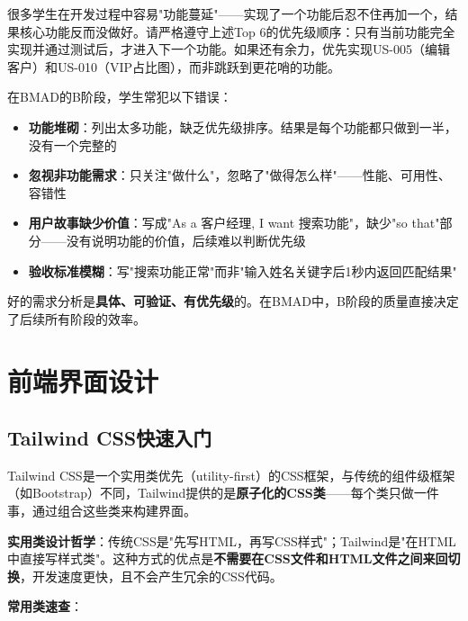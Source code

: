 \begin{notebox}[关于功能范围控制]
很多学生在开发过程中容易"功能蔓延"——实现了一个功能后忍不住再加一个，结果核心功能反而没做好。请严格遵守上述Top 6的优先级顺序：只有当前功能完全实现并通过测试后，才进入下一个功能。如果还有余力，优先实现US-005（编辑客户）和US-010（VIP占比图），而非跳跃到更花哨的功能。\end{notebox}

\begin{theorybox}[需求分析中的常见陷阱]
在BMAD的B阶段，学生常犯以下错误：
\begin{itemize}[leftmargin=2em]
  \item \textbf{功能堆砌}：列出太多功能，缺乏优先级排序。结果是每个功能都只做到一半，没有一个完整的
  \item \textbf{忽视非功能需求}：只关注"做什么"，忽略了"做得怎么样"——性能、可用性、容错性
  \item \textbf{用户故事缺少价值}：写成"As a 客户经理, I want 搜索功能"，缺少"so that"部分——没有说明功能的价值，后续难以判断优先级
  \item \textbf{验收标准模糊}：写"搜索功能正常"而非"输入姓名关键字后1秒内返回匹配结果"
\end{itemize}
好的需求分析是\textbf{具体、可验证、有优先级}的。在BMAD中，B阶段的质量直接决定了后续所有阶段的效率。\end{theorybox}

\section{前端界面设计}

\subsection{Tailwind CSS快速入门}

Tailwind CSS是一个实用类优先（utility-first）的CSS框架，与传统的组件级框架（如Bootstrap）不同，Tailwind提供的是\textbf{原子化的CSS类}——每个类只做一件事，通过组合这些类来构建界面。

\textbf{实用类设计哲学}：传统CSS是"先写HTML，再写CSS样式"；Tailwind是"在HTML中直接写样式类"。这种方式的优点是\textbf{不需要在CSS文件和HTML文件之间来回切换}，开发速度更快，且不会产生冗余的CSS代码。

\textbf{常用类速查}：


